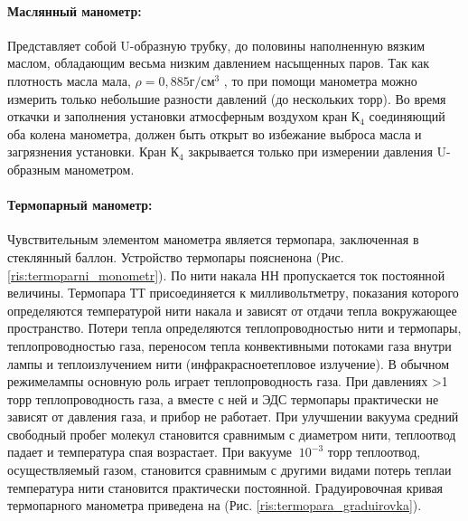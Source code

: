 \documentclass{article}
\begin{document}
    \paragraph{Маслянный манометр:}
    Представляет собой U-образную трубку, до половины наполненную вязким маслом, обладающим весьма низким давлением насыщенных паров. Так как плотность масла мала, $\rho = 0,885 г/см^3$ , то при помощи манометра можно измерить только небольшие разности давлений (до нескольких торр). Во время откачки и заполнения установки атмосферным воздухом кран $К_4$ соединяющий оба колена манометра, должен быть открыт во избежание выброса масла и загрязнения установки. Кран $К_4$ закрывается только при измерении давления U-образным манометром.


    \newpage

    \paragraph{Термопарный манометр:}
    Чувствительным элементом манометра является термопара, заключенная в стеклянный баллон. Устройство термопары поясненона (Рис. \ref{ris:termoparni_monometr}). По нити накала НН пропускается ток постоянной величины. Термопара ТТ присоединяется к милливольтметру, показания которого определяются температурой нити накала и зависят от отдачи тепла вокружающее пространство. Потери тепла определяются теплопроводностью нити и термопары, теплопроводностью газа, переносом тепла конвективными потоками газа внутри лампы и теплоизлучением нити (инфракрасноетепловое излучение). В обычном режимелампы основную роль играет теплопроводность газа. При давлениях >1 торр теплопроводность газа, а вместе с ней и ЭДС термопары практически не зависят от давления газа, и прибор не работает. При улучшении вакуума средний свободный пробег молекул становится сравнимым с диаметром нити, теплоотвод падает и температура спая возрастает. При вакууме $~10^{-3}$ торр теплоотвод, осуществляемый газом, становится сравнимым с другими видами потерь теплаи температура нити становится практически постоянной. Градуировочная кривая термопарного манометра приведена на (Рис. \ref{ris:termopara_graduirovka}).
\end{document}
